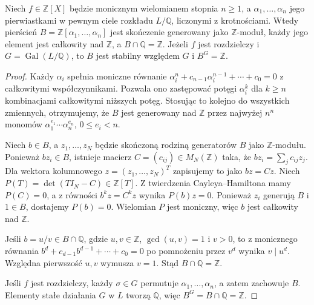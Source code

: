 \begin{lemat}
\label{aa:lem:frob-finite-order}
Niech $f\in\mathbb Z[X]$ będzie monicznym wielomianem
stopnia $n\ge1$, a $\alpha_1,\ldots,\alpha_n$ jego
pierwiastkami w pewnym ciele rozkładu $L/\mathbb Q$,
liczonymi z krotnościami. Wtedy pierścień
$B=\mathbb Z[\alpha_1,\ldots,\alpha_n]$ jest skończenie
generowany jako $\mathbb Z$-moduł, każdy jego element jest
całkowity nad $\mathbb Z$, a $B\cap\mathbb Q=\mathbb Z$.
Jeżeli $f$ jest rozdzielczy i $G=\operatorname{Gal}(L/\mathbb Q)$,
to $B$ jest stabilny względem $G$ i $B^G=\mathbb Z$.
\end{lemat}
\begin{proof}
Każdy $\alpha_i$ spełnia moniczne równanie
$\alpha_i^n+c_{n-1}\alpha_i^{n-1}+\cdots+c_0=0$
z całkowitymi współczynnikami. Pozwala ono zastępować
potęgi $\alpha_i^k$ dla $k\ge n$ kombinacjami całkowitymi
niższych potęg. Stosując to kolejno do wszystkich zmiennych,
otrzymujemy, że $B$ jest generowany nad $\mathbb Z$ przez
najwyżej $n^n$ monomów
$\alpha_1^{e_1}\cdots\alpha_n^{e_n}$, $0\le e_i<n$.

Niech $b\in B$, a $z_1,\ldots,z_N$ będzie skończoną rodziną
generatorów $B$ jako $\mathbb Z$-modułu.
Ponieważ $b z_i\in B$, istnieje macierz
$C=(c_{ij})\in M_N(\mathbb Z)$ taka, że
$b z_i=\sum_j c_{ij}z_j$. Dla wektora kolumnowego
$z=(z_1,\ldots,z_N)^T$ zapisujemy to jako $bz=Cz$.
Niech $P(T)=\det(TI_N-C)\in\mathbb Z[T]$.
Z twierdzenia Cayleya–Hamiltona mamy $P(C)=0$,
a z równości $b^kz=C^kz$ wynika $P(b)z=0$.
Ponieważ $z_i$ generują $B$ i $1\in B$, dostajemy $P(b)=0$.
Wielomian $P$ jest moniczny, więc $b$ jest całkowity
nad $\mathbb Z$.

Jeśli $b=u/v\in B\cap\mathbb Q$, gdzie $u,v\in\mathbb Z$,
$\gcd(u,v)=1$ i $v>0$, to z monicznego równania
$b^d+c_{d-1}b^{d-1}+\cdots+c_0=0$ po pomnożeniu
przez $v^d$ wynika $v\mid u^d$. Względna pierwszość
$u,v$ wymusza $v=1$. Stąd $B\cap\mathbb Q=\mathbb Z$.

Jeśli $f$ jest rozdzielczy, każdy $\sigma\in G$ permutuje
$\alpha_1,\ldots,\alpha_n$, a zatem zachowuje $B$.
Elementy stałe działania $G$ w $L$ tworzą $\mathbb Q$,
więc $B^G=B\cap\mathbb Q=\mathbb Z$.
\end{proof}

